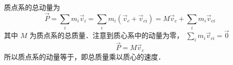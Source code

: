 
质点系的总动量为
\begin{equation}
\vec P = \sum_i m_i \vec v_i  = \sum_i m_i (\vec v_c + \vec v_{ci})  = M \vec v_c + \sum_i  m_i \vec v_{ci} 
\end{equation}
其中 $M$ 为质点系的总质量．注意到质心系中的动量为零， $\sum_i  m_i \vec v_{ci}  = \vec 0$
\begin{equation}
\vec P = M \vec v_c
\end{equation}
所以质点系的动量等于，即总质量乘以质心的速度．

 
